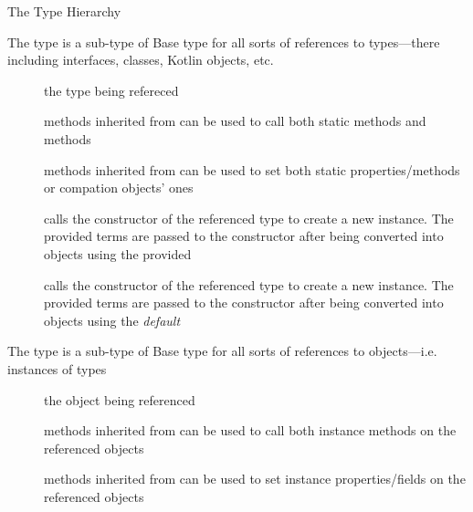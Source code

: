 \documentclass[handout]{beamer}
\begin{document}
\begin{frame}[allowframebreaks]{The  Type Hierarchy}
    \framebreak

    \begin{block}{The  type is a sub-type of }
        \centering
        Base type for all sorts of references to \alert{types}---there including interfaces, classes, Kotlin objects, etc.
    \end{block}
    \begin{description}
        \item[] the type being refereced

        \item[] methods inherited from  can be used to call both \alert{static} methods and  methods
        
        \item[] methods inherited from  can be used to set both static properties/methods or compation objects' ones
        
        \item[] calls the constructor of the referenced type to create a new instance. The provided terms are passed to the constructor after being converted into objects using the provided 
        
        \item[] calls the constructor of the referenced type to create a new instance. The provided terms are passed to the constructor after being converted into objects using the \emph{default} 
    \end{description}

    \framebreak

    \begin{block}{The  type is a sub-type of }
        \centering
        Base type for all sorts of references to \alert{objects}---i.e. instances of types
    \end{block}
    \begin{description}
        \item[] the object being referenced
        
        \item[] methods inherited from  can be used to call both \alert{instance} methods on the referenced objects
        
        \item[] methods inherited from  can be used to set \alert{instance} properties/fields on the referenced objects
    \end{description}


\end{frame}
\end{document}
